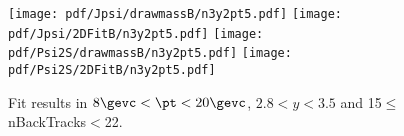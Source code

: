 \begin{figure}[H]
\begin{center}
\texttt{[image: pdf/Jpsi/drawmassB/n3y2pt5.pdf]}
\texttt{[image: pdf/Jpsi/2DFitB/n3y2pt5.pdf]}
\vspace*{-0.5cm}
\texttt{[image: pdf/Psi2S/drawmassB/n3y2pt5.pdf]}
\texttt{[image: pdf/Psi2S/2DFitB/n3y2pt5.pdf]}
\vspace*{-0.5cm}
\end{center}
\caption{Fit results in $8\gevc<\pt<20\gevc$, $2.8<y<3.5$ and 15$\leq$nBackTracks$<$22.}
\label{Fitn3y2pt5}
\end{figure}
